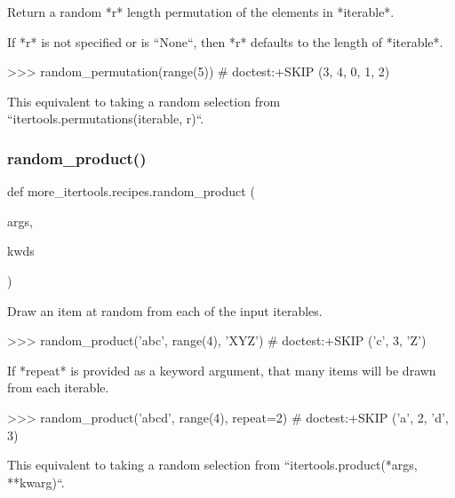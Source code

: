 \begin{DoxyVerb}Return a random *r* length permutation of the elements in *iterable*.

If *r* is not specified or is ``None``, then *r* defaults to the length of
*iterable*.

    >>> random_permutation(range(5))  # doctest:+SKIP
    (3, 4, 0, 1, 2)

This equivalent to taking a random selection from
``itertools.permutations(iterable, r)``.\end{DoxyVerb}
 \mbox{\label{namespacemore__itertools_1_1recipes_a648d1e66c985c58f3e359f53b475e8eb}} 
\subsubsection{\texorpdfstring{random\+\_\+product()}{random\_product()}}
{\footnotesize\ttfamily def more\+\_\+itertools.\+recipes.\+random\+\_\+product (\begin{DoxyParamCaption}\item[{}]{args,  }\item[{}]{kwds }\end{DoxyParamCaption})}

\begin{DoxyVerb}Draw an item at random from each of the input iterables.

    >>> random_product('abc', range(4), 'XYZ')  # doctest:+SKIP
    ('c', 3, 'Z')

If *repeat* is provided as a keyword argument, that many items will be
drawn from each iterable.

    >>> random_product('abcd', range(4), repeat=2)  # doctest:+SKIP
    ('a', 2, 'd', 3)

This equivalent to taking a random selection from
``itertools.product(*args, **kwarg)``.\end{DoxyVerb}
 \mbox{\label{namespacemore__itertools_1_1recipes_a18056a0b9753f79901a3c7fd04ac880f}} 
